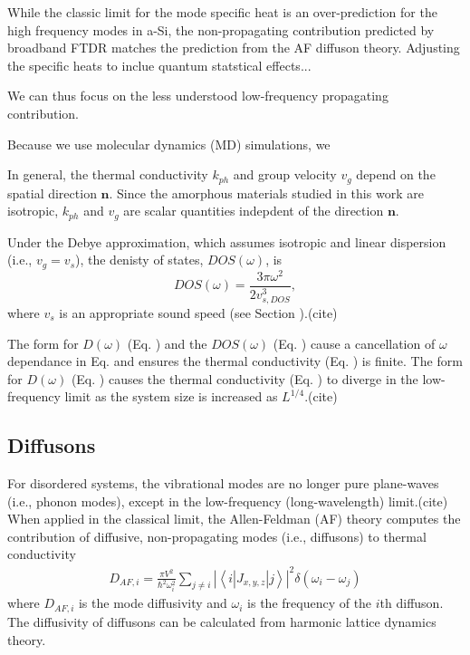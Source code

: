 \documentclass[aps,prb,twocolumn,superscriptaddress,footinbib,amsmath,amssymb,floatfix]{revtex4}
\begin{document}
While the classic limit for the mode specific heat is 
an over-prediction for the high frequency modes in a-Si, 
the non-propagating contribution 
predicted by broadband FTDR matches the prediction from the AF diffuson theory.
Adjusting the specific heats to inclue quantum statstical effects...

We can thus focus on the less understood low-frequency propagating contribution. 






Because we use molecular dynamics (MD) simulations, we



In general, the thermal conductivity $k_{ph}$ and group velocity 
$v_{g}$ depend on the spatial direction $\mathbf{n}$. 
Since the amorphous materials studied in this work are isotropic, 
$k_{ph}$ and $v_{g}$ are scalar quantities indepdent of the direction 
$\mathbf{n}$. 



Under the Debye approximation, 
which assumes isotropic and linear dispersion (i.e., $v_g = v_s$), 
the denisty of states, $DOS(\omega)$, is
\begin{equation}\label{EQ:DOS_debye}
DOS(\omega) = \frac{3\pi\omega^2}{2v_{s,DOS}^3},
\end{equation}
where $v_s$ is an appropriate sound speed (see Section ).(cite)

The form for $D(\omega)$ (Eq. ) and the $DOS(\omega)$ (Eq. ) 
cause a cancellation of $\omega$ dependance in Eq. and ensures the 
thermal conductivity (Eq. ) is finite. The form for $D(\omega)$ 
(Eq. ) causes the thermal conductivity (Eq. ) to diverge 
in the low-frequency limit as the system size is increased as 
$L^{1/4}$.(cite)  

\subsection{\label{S:Theory:Thermal:Diffusons}Diffusons}

For disordered systems, the vibrational modes are no 
longer pure plane-waves (i.e., phonon modes), except in the low-frequency 
(long-wavelength) limit.(cite) When applied in the classical limit, 
the Allen-Feldman (AF) theory computes 
the contribution of diffusive, non-propagating modes (i.e., diffusons) 
to thermal conductivity\cite{allen_thermal_1993} 
\begin{equation}\label{EQ:DAF}
\begin{split}
D_{AF,i} = \frac{\pi V^2}{\hbar^2\omega^2_i}\sum_{j\neq i}
|\left< i | J_{x,y,z} | j \right>|^2 \delta(\omega_i - \omega_j)
\end{split}
\end{equation}
where $D_{AF,i}$ is the mode diffusivity and $\omega_i$ is the 
frequency of the $i$th diffuson. The diffusivity of diffusons 
can be calculated from harmonic lattice dynamics theory.
\cite{allen_thermal_1993,feldman_thermal_1993,feldman_numerical_1999} 
\end{document}
